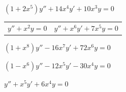 \begin{exerciselist}

  \item\label{exer:7.2.39} $(1+2x^{5})y''+14x^{4}y'+10x^{3}y=0$

  \vspace*{-10pt}
  \begin{tabular}[t]{@{}p{100pt}@{}p{168pt}}
    \item\label{exer:7.2.40} $y''+x^{2}y=0$ &
    \item\label{exer:7.2.41} $y''+x^{6}y'+7x^{5}y=0$
  \end{tabular}

  \item\label{exer:7.2.42} $(1+x^{8})y''-16x^{7}y'+72x^{6}y=0$

  \item\label{exer:7.2.43} $(1-x^{6})y''-12x^{5}y'-30x^{4}y=0$

  \item\label{exer:7.2.44} $y''+x^{5}y'+6x^{4}y=0$
\end{exerciselist}
